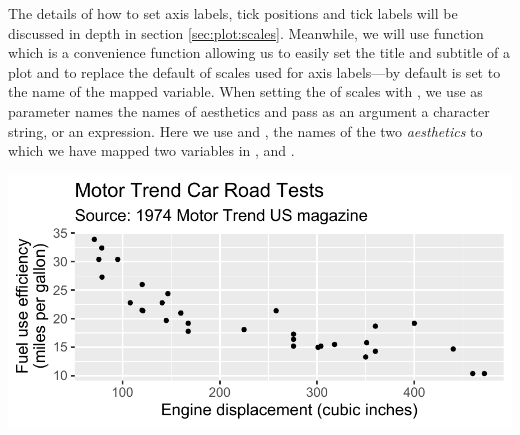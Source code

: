 \documentclass[krantz2]{krantz}\usepackage{knitr}
\begin{document}
The details of how to set axis labels, tick positions and tick labels will be discussed in depth in section \ref{sec:plot:scales}. Meanwhile, we will use function  which is a convenience function allowing us to easily set the title and subtitle of a plot and to replace the default  of scales used for axis labels---by default  is set to the name of the mapped variable. When setting the  of scales with , we use as parameter names the names of aesthetics and pass as an argument a character string, or an \Rlang expression. Here we use  and , the names of the two \emph{aesthetics} to which we have mapped two variables in ,  and .

\begin{knitrout}\footnotesize
{}\color{fgcolor}\begin{kframe}
\begin{alltt}
\hlstd{(} 
       \hlstd{(}    \hlopt{+}
  \hlstd{()} \hlopt{+}
  \hlstd{(} \hlstd{=} \hlstd{,}
        \hlstd{=} \hlstd{,}
        \hlstd{=} \hlstd{,}
        \hlstd{=} \hlstd{)}
\end{alltt}
\end{kframe}

{\centering \includegraphics[width=.7\textwidth]{figure/pos-ggplot-basics-11-1}

}



\end{knitrout}
\end{document}

